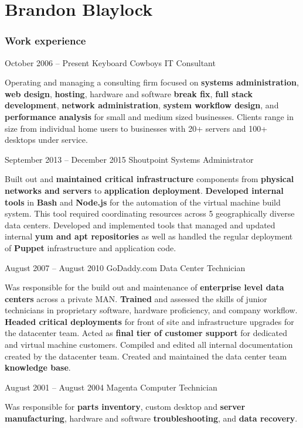 \documentclass{tccv}
\begin{document}
\part{Brandon Blaylock}

\section{Work experience}

\begin{eventlist}

\item{October 2006 -- Present}
     {Keyboard Cowboys}
     {IT Consultant}

Operating and managing a consulting firm focused on \textbf{systems administration}, \textbf{web design}, \textbf{hosting}, hardware and software \textbf{break fix}, \textbf{full stack development}, \textbf{network administration}, \textbf{system workflow design}, and \textbf{performance analysis} for small and medium sized businesses. Clients range in size from individual home users to businesses with 20+ servers and 100+ desktops under service.

\item{September 2013 -- December 2015}
     {Shoutpoint}
     {Systems Administrator}

Built out and \textbf{maintained critical infrastructure} components from \textbf{physical networks and servers} to \textbf{application deployment}. \textbf{Developed internal tools} in \textbf{Bash} and \textbf{Node.js} for the automation of the virtual machine build system. This tool required coordinating resources across 5 geographically diverse data centers. Developed and implemented tools that managed and updated internal \textbf{yum and apt repositories} as well as handled the regular deployment of \textbf{Puppet} infrastructure and application code.

\item{August 2007 -- August 2010}
     {GoDaddy.com}
     {Data Center Technician}

Was responsible for the build out and maintenance of \textbf{enterprise level data centers} across a private MAN. \textbf{Trained} and assessed the skills of junior technicians in proprietary software, hardware proficiency, and company workflow. \textbf{Headed critical deployments} for front of site and infrastructure upgrades for the datacenter team. Acted as \textbf{final tier of customer support} for dedicated and virtual machine customers. Compiled and edited all internal documentation created by the datacenter team. Created and maintained the data center team \textbf{knowledge base}.

\item{August 2001 -- August 2004}
     {Magenta Computer}
     {Technician}

Was responsible for \textbf{parts inventory}, custom desktop and \textbf{server manufacturing}, hardware and software \textbf{troubleshooting}, and \textbf{data recovery}.

\end{eventlist}
\end{document}
